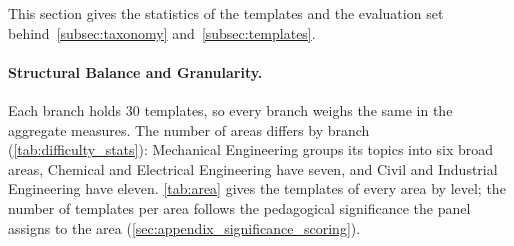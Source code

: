 This section gives the statistics of the templates and the evaluation set
behind~\autoref{subsec:taxonomy} and~\autoref{subsec:templates}.

\paragraph{Structural Balance and Granularity.} Each branch holds 30 templates, so every branch
weighs the same in the aggregate measures.
The number of areas differs by branch (\autoref{tab:difficulty_stats}): Mechanical Engineering
groups its topics into six broad areas, Chemical and Electrical Engineering have seven, and Civil
and Industrial Engineering have eleven.
\autoref{tab:area} gives the templates of every area by level; the number of templates per area
follows the pedagogical significance the panel assigns to the area
(\autoref{sec:appendix_significance_scoring}).

